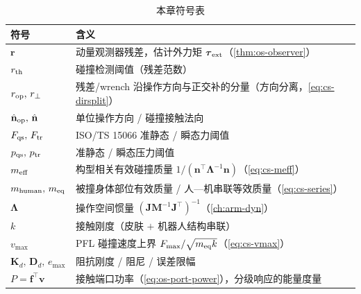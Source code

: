 \begin{table}[H]\centering\small
\caption{本章符号表}
\label{tab:acs-symbols}
\begin{tabular}{ll}
\toprule
符号 & 含义 \\
\midrule
$\mathbf r$ & 动量观测器残差，估计外力矩 $\boldsymbol\tau_{\rm ext}$（\cref{thm:os-observer}） \\
$r_{\rm th}$ & 碰撞检测阈值（残差范数） \\
$r_{\rm op},\,r_\perp$ & 残差/wrench 沿操作方向与正交补的分量（方向分离，\cref{eq:cs-dirsplit}） \\
$\hat{\mathbf n}_{\rm op},\,\hat{\mathbf n}$ & 单位操作方向 / 碰撞接触法向 \\
$F_{\rm qs},\,F_{\rm tr}$ & ISO/TS 15066 准静态 / 瞬态力阈值 \\
$p_{\rm qs},\,p_{\rm tr}$ & 准静态 / 瞬态压力阈值 \\
$m_{\rm eff}$ & 构型相关有效碰撞质量 $1/(\mathbf n^\top\boldsymbol\Lambda^{-1}\mathbf n)$（\cref{eq:cs-meff}） \\
$m_{\rm human},\,m_{\rm eq}$ & 被撞身体部位有效质量 / 人—机串联等效质量（\cref{eq:cs-series}） \\
$\boldsymbol\Lambda$ & 操作空间惯量 $(\mathbf J\mathbf M^{-1}\mathbf J^\top)^{-1}$（\cref{ch:arm-dyn}） \\
$k$ & 接触刚度（皮肤 $+$ 机器人结构串联） \\
$v_{\max}$ & PFL 碰撞速度上界 $F_{\max}/\sqrt{m_{\rm eq}k}$（\cref{eq:cs-vmax}） \\
$\mathbf K_d,\,\mathbf D_d,\,e_{\max}$ & 阻抗刚度 / 阻尼 / 误差限幅 \\
$P=\mathbf f^\top\mathbf v$ & 接触端口功率（\cref{eq:os-port-power}），分级响应的能量度量 \\
\bottomrule
\end{tabular}
\end{table}
